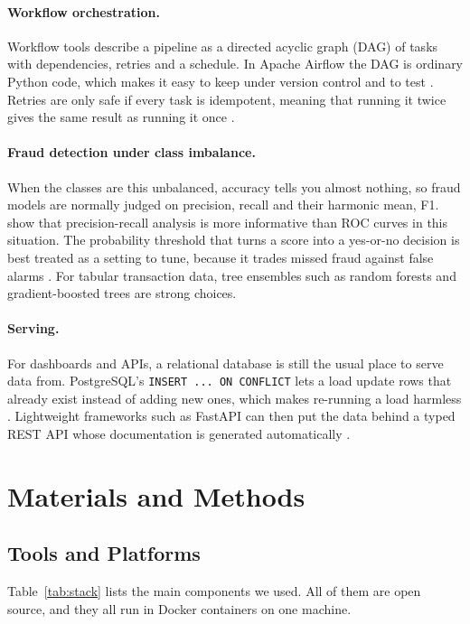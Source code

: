 \documentclass[11pt,a4paper]{article}
\newcommand{\code}[1]{\texttt{#1}}
\begin{document}
\paragraph{Workflow orchestration.} Workflow tools describe a pipeline as a
directed acyclic graph (DAG) of tasks with dependencies, retries and a schedule.
In Apache Airflow the DAG is ordinary Python code, which makes it easy to keep
under version control and to test \citep{airflow}. Retries are only safe if every
task is idempotent, meaning that running it twice gives the same result as
running it once \citep{kleppmann2017designing}.

\paragraph{Fraud detection under class imbalance.} When the classes are this
unbalanced, accuracy tells you almost nothing, so fraud models are normally judged
on precision, recall and their harmonic mean, F1. \citet{saito2015precision} show
that precision-recall analysis is more informative than ROC curves in this
situation. The probability threshold that turns a score into a yes-or-no decision
is best treated as a setting to tune, because it trades missed fraud against false
alarms \citep{dalpozzolo2015calibrating}. For tabular transaction data, tree
ensembles such as random forests \citep{breiman2001random} and gradient-boosted
trees \citep{friedman2001greedy} are strong choices.

\paragraph{Serving.} For dashboards and APIs, a relational database is still the
usual place to serve data from. PostgreSQL's \code{INSERT ... ON CONFLICT} lets a
load update rows that already exist instead of adding new ones, which makes
re-running a load harmless \citep{postgres}. Lightweight frameworks such as
FastAPI can then put the data behind a typed REST API whose documentation is
generated automatically \citep{fastapi}.

\section{Materials and Methods}

\subsection{Tools and Platforms}
Table~\ref{tab:stack} lists the main components we used. All of them are open
source, and they all run in Docker containers on one machine.
\end{document}
